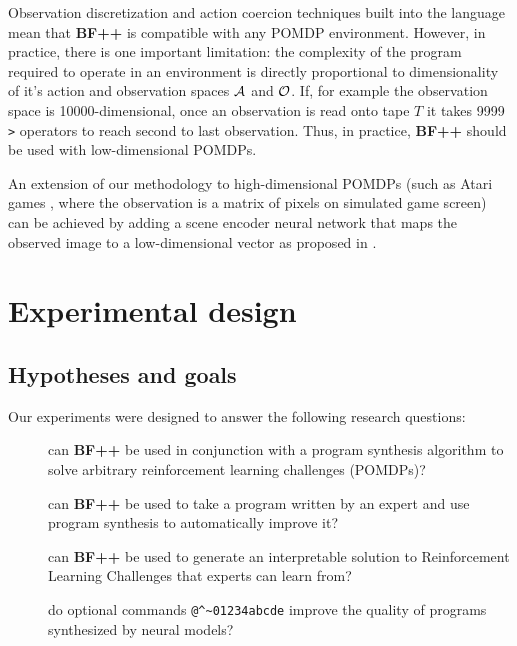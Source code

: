 Observation discretization and action coercion techniques built into the language mean that \textbf{BF++} is compatible with any POMDP environment. 
However, in practice, there is one important limitation: the complexity of the program required to operate in an environment is directly proportional to dimensionality of it's action and observation spaces $\mathcal{A}$ and $\mathcal{O}$. 
If, for example the observation space is 10000-dimensional, once an observation is read onto tape $T$ it takes 9999 \verb|>| operators to reach second to last observation.
Thus, in practice, \textbf{BF++} should be used with low-dimensional POMDPs.

An extension of our methodology to high-dimensional POMDPs (such as Atari games \cite{bellemareArcadeLearningEnvironment2013}, where the observation is a matrix of pixels on simulated game screen) can be achieved by adding a scene encoder neural network that maps the observed image to a low-dimensional vector as proposed in \cite{kimuraDAQNDeepAutoencoder2018}.

\newpage
\section{Experimental design}
\label{sec:bfpp-experiments}

\subsection{Hypotheses and goals}
\label{sec:exgoals}

Our experiments were designed to answer the following research questions:

\begin{description}
    \item[\rqbfpp] can \textbf{BF++} be used in conjunction with a program synthesis algorithm to solve arbitrary reinforcement learning challenges (POMDPs)?
    \item[\rqbfppexpert] can \textbf{BF++} be used to take a program written by an expert and use program synthesis to automatically improve it?
    \item[\rqbfppexplainable] can \textbf{BF++} be used to generate an interpretable solution to Reinforcement Learning Challenges that experts can learn from?
    \item[\rqbfppablation] do optional commands \verb|@^~01234abcde| improve the quality of programs synthesized by neural models?
\end{description}


